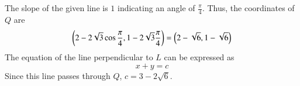 The slope of the given line is $1$ indicating an angle of $\frac{\pi}{4}$. Thus, the coordinates of $Q$ are 
%
\begin{equation}
\left(2 - 2\sqrt{3}\cos \frac{\pi}{4}, 1 - 2\sqrt{3}\frac{\pi}{4}\right) = \left(2 - \sqrt{6}, 1 - \sqrt{6}\right)
\end{equation}
%
The equation of the line perpendicular to $L$ can be expressed as
%
\begin{equation}
x+y =c
\end{equation}
%
Since this line passes through $Q$, $c = 3 - 2\sqrt{6}$.

